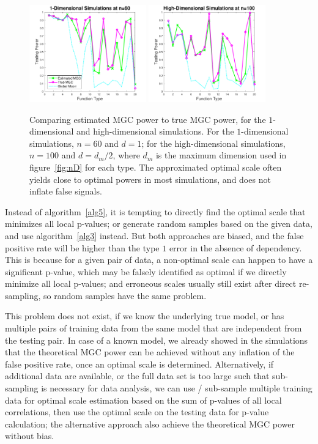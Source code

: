 \documentclass[11pt]{article}
\begin{document}
\begin{figure}[htbp]
\centering
\includegraphics[width=0.45\textwidth]{Figures/Fig9}
\includegraphics[width=0.45\textwidth]{Figures/Fig10}
\caption{Comparing estimated MGC power to true MGC power, for the $1$-dimensional and high-dimensional simulations. For the $1$-dimensional simulations, $n=60$ and $d=1$; for the high-dimensional simulations, $n=100$ and $d=d_{m}/2$, where $d_{m}$ is the maximum dimension used in figure~\ref{fig:nD} for each type. The approximated optimal scale often yields close to optimal powers in most simulations, and does not inflate false signals.} 
\label{figSimPerm}
\end{figure}
%
%
%
%
Instead of algorithm~\ref{alg5}, it is tempting to directly find the optimal scale that minimizes all local p-values; or generate random samples based on the given data, and use algorithm~\ref{alg3} instead. But both approaches are biased, and the false positive rate will be higher than the type $1$ error in the absence of dependency. This is because for a given pair of data, a non-optimal scale can happen to have a significant p-value, which may be falsely identified as optimal if we directly minimize all local p-values; and erroneous scales usually still exist after direct re-sampling, so random samples have the same problem. 

This problem does not exist, if we know the underlying true model, or has multiple pairs of training data from the same model that are independent from the testing pair. In case of a known model, we already showed in the simulations that the theoretical MGC power can be achieved without any inflation of the false positive rate, once an optimal scale is determined. Alternatively, if additional data are available, or the full data set is too large such that sub-sampling is necessary for data analysis, we can use / sub-sample multiple training data for optimal scale estimation based on the sum of p-values of all local correlations, then use the optimal scale on the testing data for p-value calculation; the alternative approach also achieve the theoretical MGC power without bias.
\end{document}
